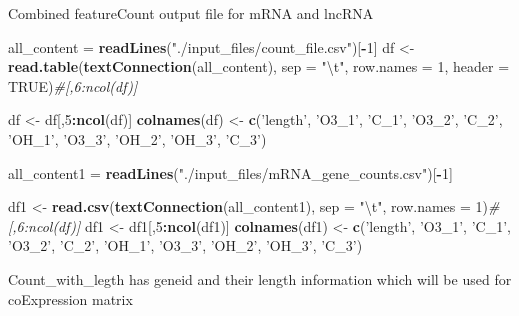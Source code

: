 \documentclass[]{article}
\newenvironment{Shaded}{\begin{snugshade}}{\end{snugshade}}
\newcommand{\CharTok}[1]{\textcolor[rgb]{0.31,0.60,0.02}{#1}}
\newcommand{\CommentTok}[1]{\textcolor[rgb]{0.56,0.35,0.01}{\textit{#1}}}
\newcommand{\DataTypeTok}[1]{\textcolor[rgb]{0.13,0.29,0.53}{#1}}
\newcommand{\DecValTok}[1]{\textcolor[rgb]{0.00,0.00,0.81}{#1}}
\newcommand{\KeywordTok}[1]{\textcolor[rgb]{0.13,0.29,0.53}{\textbf{#1}}}
\newcommand{\NormalTok}[1]{#1}
\newcommand{\OperatorTok}[1]{\textcolor[rgb]{0.81,0.36,0.00}{\textbf{#1}}}
\newcommand{\OtherTok}[1]{\textcolor[rgb]{0.56,0.35,0.01}{#1}}
\newcommand{\StringTok}[1]{\textcolor[rgb]{0.31,0.60,0.02}{#1}}
\begin{document}
Combined featureCount output file for mRNA and lncRNA

\begin{Shaded}
\begin{Highlighting}[]
\NormalTok{all_content =}\StringTok{ }\KeywordTok{readLines}\NormalTok{(}\StringTok{"./input_files/count_file.csv"}\NormalTok{)[}\OperatorTok{-}\DecValTok{1}\NormalTok{]}
\NormalTok{df <-}\StringTok{ }\KeywordTok{read.table}\NormalTok{(}\KeywordTok{textConnection}\NormalTok{(all_content), }\DataTypeTok{sep =} \StringTok{"}\CharTok{\textbackslash{}t}\StringTok{"}\NormalTok{, }\DataTypeTok{row.names =} \DecValTok{1}\NormalTok{, }\DataTypeTok{header =} \OtherTok{TRUE}\NormalTok{)}\CommentTok{#[,6:ncol(df)]}

\NormalTok{df <-}\StringTok{ }\NormalTok{df[,}\DecValTok{5}\OperatorTok{:}\KeywordTok{ncol}\NormalTok{(df)]}
\KeywordTok{colnames}\NormalTok{(df) <-}\StringTok{ }\KeywordTok{c}\NormalTok{(}\StringTok{'length'}\NormalTok{, }\StringTok{'O3_1'}\NormalTok{, }\StringTok{'C_1'}\NormalTok{, }\StringTok{'O3_2'}\NormalTok{, }\StringTok{'C_2'}\NormalTok{, }\StringTok{'OH_1'}\NormalTok{, }\StringTok{'O3_3'}\NormalTok{, }
                  \StringTok{'OH_2'}\NormalTok{, }\StringTok{'OH_3'}\NormalTok{, }\StringTok{'C_3'}\NormalTok{)}

\NormalTok{all_content1 =}\StringTok{ }\KeywordTok{readLines}\NormalTok{(}\StringTok{"./input_files/mRNA_gene_counts.csv"}\NormalTok{)[}\OperatorTok{-}\DecValTok{1}\NormalTok{]}

\NormalTok{df1 <-}\StringTok{ }\KeywordTok{read.csv}\NormalTok{(}\KeywordTok{textConnection}\NormalTok{(all_content1), }\DataTypeTok{sep =} \StringTok{"}\CharTok{\textbackslash{}t}\StringTok{"}\NormalTok{, }\DataTypeTok{row.names =} \DecValTok{1}\NormalTok{)}\CommentTok{#[,6:ncol(df)]}
\NormalTok{df1 <-}\StringTok{ }\NormalTok{df1[,}\DecValTok{5}\OperatorTok{:}\KeywordTok{ncol}\NormalTok{(df1)]}
\KeywordTok{colnames}\NormalTok{(df1) <-}\StringTok{ }\KeywordTok{c}\NormalTok{(}\StringTok{'length'}\NormalTok{, }\StringTok{'O3_1'}\NormalTok{, }\StringTok{'C_1'}\NormalTok{, }\StringTok{'O3_2'}\NormalTok{, }\StringTok{'C_2'}\NormalTok{, }\StringTok{'OH_1'}\NormalTok{, }\StringTok{'O3_3'}\NormalTok{, }
                   \StringTok{'OH_2'}\NormalTok{, }\StringTok{'OH_3'}\NormalTok{, }\StringTok{'C_3'}\NormalTok{)}
\end{Highlighting}
\end{Shaded}

Count\_with\_legth has geneid and their length information which will be
used for coExpression matrix
\end{document}
